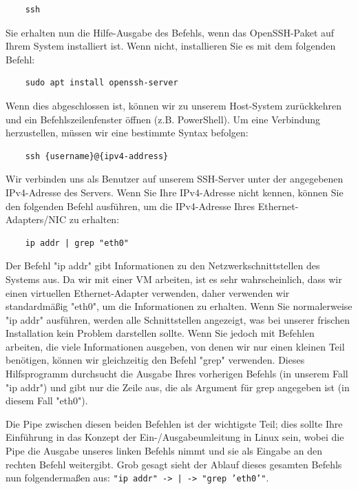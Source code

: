 \documentclass[]{article}
\begin{document}
\begin{verbatim}
    ssh
\end{verbatim}

Sie erhalten nun die Hilfe-Ausgabe des Befehls, wenn das OpenSSH-Paket auf Ihrem System installiert ist. Wenn nicht, installieren Sie es mit dem folgenden Befehl:

\begin{verbatim}
    sudo apt install openssh-server
\end{verbatim}

Wenn dies abgeschlossen ist, können wir zu unserem Host-System zurückkehren und ein Befehlszeilenfenster öffnen (z.B. PowerShell). Um eine Verbindung herzustellen, müssen wir eine bestimmte Syntax befolgen:

\begin{verbatim}
    ssh {username}@{ipv4-address}
\end{verbatim}

Wir verbinden uns als Benutzer auf unserem SSH-Server unter der angegebenen IPv4-Adresse des Servers. Wenn Sie Ihre IPv4-Adresse nicht kennen, können Sie den folgenden Befehl ausführen, um die IPv4-Adresse Ihres Ethernet-Adapters/NIC zu erhalten:

\begin{verbatim}
    ip addr | grep "eth0"
\end{verbatim}

Der Befehl "ip addr" gibt Informationen zu den Netzwerkschnittstellen des Systems aus. Da wir mit einer VM arbeiten, ist es sehr wahrscheinlich, dass wir einen virtuellen Ethernet-Adapter verwenden, daher verwenden wir standardmäßig "eth0", um die Informationen zu erhalten. Wenn Sie normalerweise "ip addr" ausführen, werden alle Schnittstellen angezeigt, was bei unserer frischen Installation kein Problem darstellen sollte. Wenn Sie jedoch mit Befehlen arbeiten, die viele Informationen ausgeben, von denen wir nur einen kleinen Teil benötigen, können wir gleichzeitig den Befehl "grep" verwenden. Dieses Hilfsprogramm durchsucht die Ausgabe Ihres vorherigen Befehls (in unserem Fall "ip addr") und gibt nur die Zeile aus, die als Argument für grep angegeben ist (in diesem Fall "eth0").

Die Pipe zwischen diesen beiden Befehlen ist der wichtigste Teil; dies sollte Ihre Einführung in das Konzept der Ein-/Ausgabeumleitung in Linux sein, wobei die Pipe die Ausgabe unseres linken Befehls nimmt und sie als Eingabe an den rechten Befehl weitergibt. Grob gesagt sieht der Ablauf dieses gesamten Befehls nun folgendermaßen aus: \texttt{"ip addr" -> | -> "grep 'eth0'"}.
\end{document}

